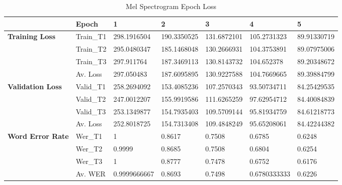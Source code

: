 \begin{table}[!ht]
    \centering
    \caption{Mel Spectrogram Epoch Loss}
    \begin{adjustbox}{width=\textwidth,keepaspectratio}
    \begin{tabular}{|l|l|l|l|l|l|l|}
    \hline
        \textbf{} & \textbf{Epoch} & \textbf{1} & \textbf{2} & \textbf{3} & \textbf{4} & \textbf{5} \\ \hline
        \textbf{Training Loss} & Train\_T1 & 298.1916504 & 190.3350525 & 131.6872101 & 105.2731323 & 89.91330719 \\ \hline
        \textbf{} & Train\_T2 & 295.0480347 & 185.1468048 & 130.2666931 & 104.3753891 & 89.07975006 \\ \hline
        \textbf{} & Train\_T3 & 297.911764 & 187.3469113 & 130.8143732 & 104.652378 & 89.20348672 \\ \hline
        \textbf{} & Av. Loss & 297.050483 & 187.6095895 & 130.9227588 & 104.7669665 & 89.39884799 \\ \hline
        \textbf{Validation Loss} & Valid\_T1 & 258.2694092 & 153.4085236 & 107.2570343 & 93.50734711 & 84.25429535 \\ \hline
        \textbf{} & Valid\_T2 & 247.0012207 & 155.9919586 & 111.6265259 & 97.62954712 & 84.40084839 \\ \hline
        \textbf{} & Valid\_T3 & 253.1349877 & 154.7935403 & 109.5709144 & 95.81934759 & 84.61218773 \\ \hline
        \textbf{} & Av. Loss & 252.8018725 & 154.7313408 & 109.4848249 & 95.65208061 & 84.42244382 \\ \hline
        \textbf{Word Error Rate} & Wer\_T1 & 1 & 0.8617 & 0.7508 & 0.6785 & 0.6248 \\ \hline
        \textbf{} & Wer\_T2 & 0.9999 & 0.8685 & 0.7508 & 0.6804 & 0.6254 \\ \hline
        \textbf{} & Wer\_T3 & 1 & 0.8777 & 0.7478 & 0.6752 & 0.6176 \\ \hline
        \textbf{} & Av. WER & 0.9999666667 & 0.8693 & 0.7498 & 0.6780333333 & 0.6226 \\ \hline
    \end{tabular}
    \end{adjustbox}
    \label{melspectro_epochloss}
\end{table}

